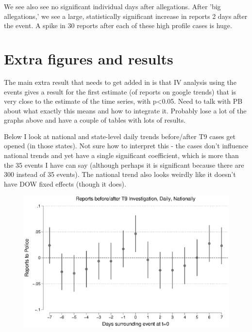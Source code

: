 \documentclass[AER,draftmode]{AEA}
\begin{document}
We see also see no significant individual days after allegations. After 'big allegations,' we see a large, statistically significant increase in reports 2 days after the event. A spike in 30 reports after each of these high profile cases is huge.

\clearpage
\section{Extra figures and results}

The main extra result that needs to get added in is that IV analysis using the events gives a result for the first estimate (of reports on google trends) that is very close to the estimate of the time series, with p<0.05. Need to talk with PB about what exactly this means and how to integrate it. Probably lose a lot of the graphs above and have a couple of tables with lots of results.

Below I look at national and state-level daily trends before/after T9 cases get opened (in those states). Not sure how to interpret this - the cases don't influence national trends and yet have a single significant coefficient, which is more than the 35 events I have can say (although perhaps it is significant because there are 300 instead of 35 events). The national trend also looks weirdly like it doesn't have DOW fixed effects (though it does). 

\begin{figure}
\includegraphics[width=\linewidth]{figures/police_national_cases.eps}
\end{figure}
\end{document}
